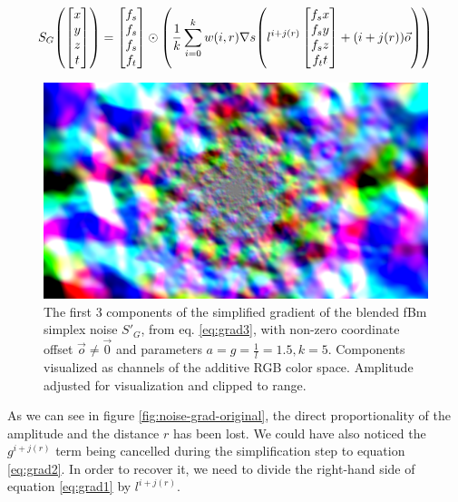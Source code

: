 \begin{equation}\label{eq:grad2}
    S_G\mleft(\begin{bmatrix}x\\y\\z\\t\end{bmatrix}\mright) = \begin{bmatrix}f_s\\f_s\\f_s\\f_t\end{bmatrix} \odot \mleft( \frac{1}{k} \sum_{i=0}^{k} w(i, r) \nabla s\mleft(l^{i+j(r)} \begin{bmatrix}f_sx\\f_sy\\f_sz\\f_tt\end{bmatrix} + (i + j(r)) \vec{o}\mright) \mright)
\end{equation}

\begin{figure}[htb]
    \centering
    \ifgraphics
        \includegraphics[width=\linewidth]{img/noise-grad-modulated.png}%
    \fi
    \caption{The first 3 components of the simplified gradient of the blended \ac{fBm} simplex noise $S'_G$, from eq. \ref{eq:grad3}, with non-zero coordinate offset $\vec{o} \ne \vec{0}$ and parameters $a = g = \frac{1}{l} = 1.5, k = 5$. Components visualized as channels of the additive RGB color space. Amplitude adjusted for visualization and clipped to range.}
    \label{fig:noise-grad-modulated}
\end{figure}

As we can see in figure \ref{fig:noise-grad-original}, the direct proportionality of the amplitude and the distance $r$ has been lost. We could have also noticed the $g^{i+j(r)}$ term being cancelled during the simplification step to equation \ref{eq:grad2}. In order to recover it, we need to divide the right-hand side of equation \ref{eq:grad1} by $l^{i+j(r)}$.

